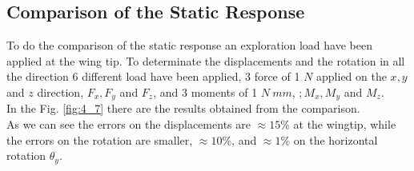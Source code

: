 \subsection{Comparison of the Static Response}
To do the comparison of the static response an exploration load have been applied at the wing tip. To determinate the displacements and the rotation in all the direction 6 different load have been applied, 3 force of 1 $N$ applied on the $x, y$ and $z$ direction, $F_x,F_y$ and $F_z$, and 3 moments of 1 $N\ mm$, $;M_x,M_y$ and $M_z$.\\
In the Fig. \ref{fig:4_7} there are the results obtained from the comparison.\\
As we can see the errors on the displacements are $\approx 15\%$ at the wingtip, while the errors on the rotation are smaller, $\approx 10\%$, and $\approx 1\%$ on the horizontal rotation $\theta_y$. \\
